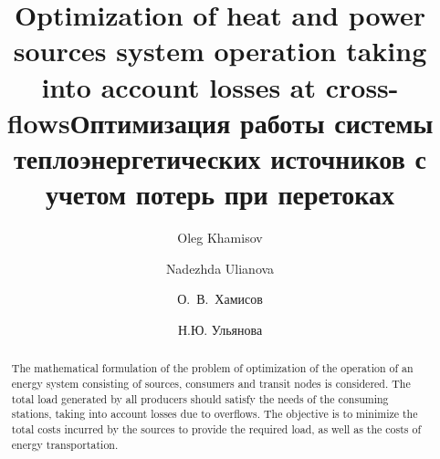 \begin{englishtitle}
\title{Optimization of heat and power sources system operation taking into account losses at cross-flows}
\author{Oleg Khamisov \and Nadezhda Ulianova}

\maketitle

\begin{abstract}
The mathematical formulation of the problem of optimization of the operation of an energy system consisting of sources, consumers and transit nodes is considered. The total load generated by all producers should satisfy the needs of the consuming stations, taking into account losses due to overflows. The objective is to minimize the total costs incurred by the sources to provide the required load, as well as the costs of energy transportation.

\end{abstract}
\end{englishtitle}

\iffalse
\documentclass[12pt]{llncs}
\usepackage[T2A]{fontenc}
\usepackage[utf8]{inputenc}
\usepackage[english,russian]{babel}
\usepackage[russian]{nla}




\fi

\title{Оптимизация работы системы теплоэнергетических источников с учетом потерь при перетоках}

 \author{ О.~В.~Хамисов  %
  \and
Н.Ю. Ульянова %
} 

\maketitle

